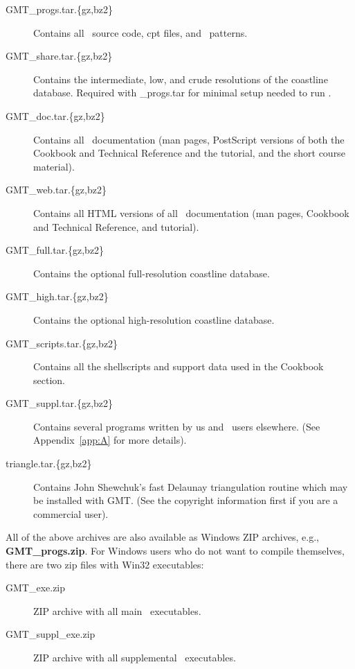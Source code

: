 \begin{description}

\item[GMT\_progs.tar.\{gz,bz2\}] Contains all \GMT\ source code,
cpt files, and \PS\ patterns.

\item [GMT\_share.tar.\{gz,bz2\}] Contains the intermediate,
low, and crude resolutions of the coastline database.  Required
with \_progs.tar for minimal setup needed to run \GMT.

\item[GMT\_doc.tar.\{gz,bz2\}] Contains all \GMT\ documentation
(man pages, PostScript versions of both the Cookbook and Technical
Reference and the tutorial, and the short course material).

\item[GMT\_web.tar.\{gz,bz2\}] Contains all HTML versions of all
\GMT\ documentation (man pages, Cookbook and Technical Reference,
and tutorial).

\item[GMT\_full.tar.\{gz,bz2\}] Contains the optional
full-resolution coastline database.

\item[GMT\_high.tar.\{gz,bz2\}] Contains the optional
high-resolution coastline database.

\item[GMT\_scripts.tar.\{gz,bz2\}] Contains all the shellscripts
and support data used in the Cookbook section.

\item[GMT\_suppl.tar.\{gz,bz2\}] Contains several programs
written by us and \GMT\ users elsewhere. (See Appendix~\ref{app:A} for more
details).

\item[triangle.tar.\{gz,bz2\}] Contains John Shewchuk's fast Delaunay
triangulation routine which may be installed with GMT. (See the copyright
information first if you are a commercial user).

\end{description}


All of the above archives are also available as Windows ZIP archives, e.g., {\bf GMT\_progs.zip}.
For Windows users who do not want to compile themselves, there are two zip files with Win32 executables:

\begin{description}

\item[GMT\_exe.zip] ZIP archive with all main \GMT\ executables.

\item[GMT\_suppl\_exe.zip] ZIP archive with all supplemental \GMT\ executables.

\end{description}


